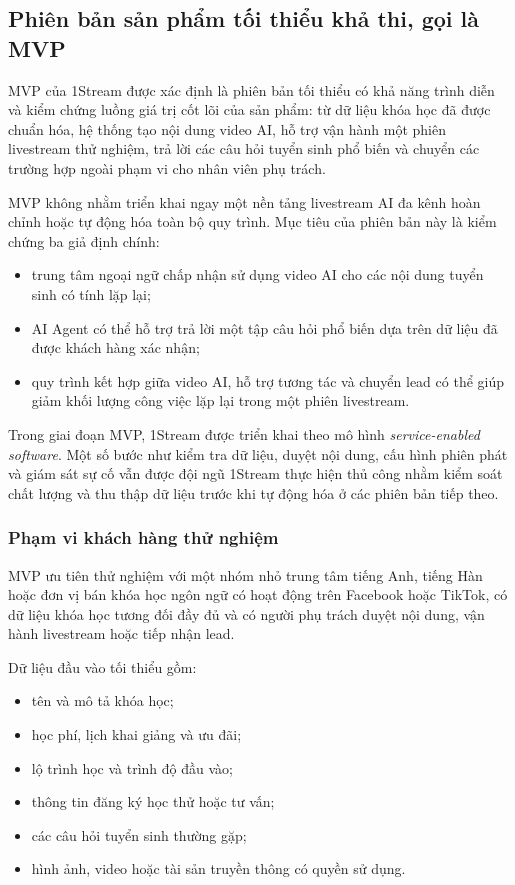 \subsection{Phiên bản sản phẩm tối thiểu khả thi, gọi là MVP}

MVP của 1Stream được xác định là phiên bản tối thiểu có khả năng trình diễn và
kiểm chứng luồng giá trị cốt lõi của sản phẩm: từ dữ liệu khóa học đã được chuẩn
hóa, hệ thống tạo nội dung video AI, hỗ trợ vận hành một phiên livestream thử
nghiệm, trả lời các câu hỏi tuyển sinh phổ biến và chuyển các trường hợp ngoài
phạm vi cho nhân viên phụ trách.

MVP không nhằm triển khai ngay một nền tảng livestream AI đa kênh hoàn chỉnh
hoặc tự động hóa toàn bộ quy trình. Mục tiêu của phiên bản này là kiểm chứng ba
giả định chính:

\begin{itemize}
    \item trung tâm ngoại ngữ chấp nhận sử dụng video AI cho các nội dung tuyển
    sinh có tính lặp lại;

    \item AI Agent có thể hỗ trợ trả lời một tập câu hỏi phổ biến dựa trên dữ
    liệu đã được khách hàng xác nhận;

    \item quy trình kết hợp giữa video AI, hỗ trợ tương tác và chuyển lead có
    thể giúp giảm khối lượng công việc lặp lại trong một phiên livestream.
\end{itemize}

Trong giai đoạn MVP, 1Stream được triển khai theo mô hình
\textit{service-enabled software}. Một số bước như kiểm tra dữ liệu, duyệt nội
dung, cấu hình phiên phát và giám sát sự cố vẫn được đội ngũ 1Stream thực hiện
thủ công nhằm kiểm soát chất lượng và thu thập dữ liệu trước khi tự động hóa ở
các phiên bản tiếp theo.

\subsubsection*{Phạm vi khách hàng thử nghiệm}

MVP ưu tiên thử nghiệm với một nhóm nhỏ trung tâm tiếng Anh, tiếng Hàn hoặc đơn
vị bán khóa học ngôn ngữ có hoạt động trên Facebook hoặc TikTok, có dữ liệu
khóa học tương đối đầy đủ và có người phụ trách duyệt nội dung, vận hành
livestream hoặc tiếp nhận lead.

Dữ liệu đầu vào tối thiểu gồm:

\begin{itemize}
    \item tên và mô tả khóa học;
    \item học phí, lịch khai giảng và ưu đãi;
    \item lộ trình học và trình độ đầu vào;
    \item thông tin đăng ký học thử hoặc tư vấn;
    \item các câu hỏi tuyển sinh thường gặp;
    \item hình ảnh, video hoặc tài sản truyền thông có quyền sử dụng.
\end{itemize}

